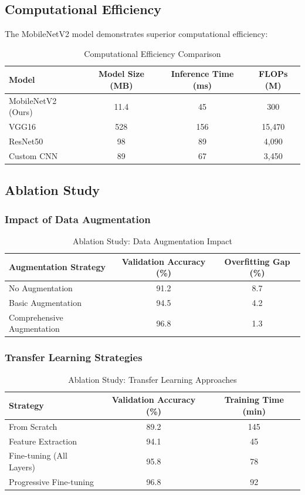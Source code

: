 \documentclass[conference,10pt,letterpaper]{IEEEtran}
\begin{document}
\subsection{Computational Efficiency}

The MobileNetV2 model demonstrates superior computational efficiency:
\begin{table}[htbp]
\centering
\caption{Computational Efficiency Comparison}
\label{tab:efficiency}
\begin{tabular}{lccc}
\toprule
Model & Model Size (MB) & Inference Time (ms) & FLOPs (M) \\
\midrule
MobileNetV2 (Ours) & 11.4 & 45 & 300 \\
VGG16 & 528 & 156 & 15,470 \\
ResNet50 & 98 & 89 & 4,090 \\
Custom CNN & 89 & 67 & 3,450 \\
\bottomrule
\end{tabular}
\end{table}

\subsection{Ablation Study}

\subsubsection{Impact of Data Augmentation}
\begin{table}[htbp]
\centering
\caption{Ablation Study: Data Augmentation Impact}
\label{tab:ablation_augmentation}
\begin{tabular}{lcc}
\toprule
Augmentation Strategy & Validation Accuracy (\%) & Overfitting Gap (\%) \\
\midrule
No Augmentation & 91.2 & 8.7 \\
Basic Augmentation & 94.5 & 4.2 \\
Comprehensive Augmentation & 96.8 & 1.3 \\
\bottomrule
\end{tabular}
\end{table}

\subsubsection{Transfer Learning Strategies}
\begin{table}[htbp]
\centering
\caption{Ablation Study: Transfer Learning Approaches}
\label{tab:ablation_transfer}
\begin{tabular}{lcc}
\toprule
Strategy & Validation Accuracy (\%) & Training Time (min) \\
\midrule
From Scratch & 89.2 & 145 \\
Feature Extraction & 94.1 & 45 \\
Fine-tuning (All Layers) & 95.8 & 78 \\
Progressive Fine-tuning & 96.8 & 92 \\
\bottomrule
\end{tabular}
\end{table}
\end{document}
